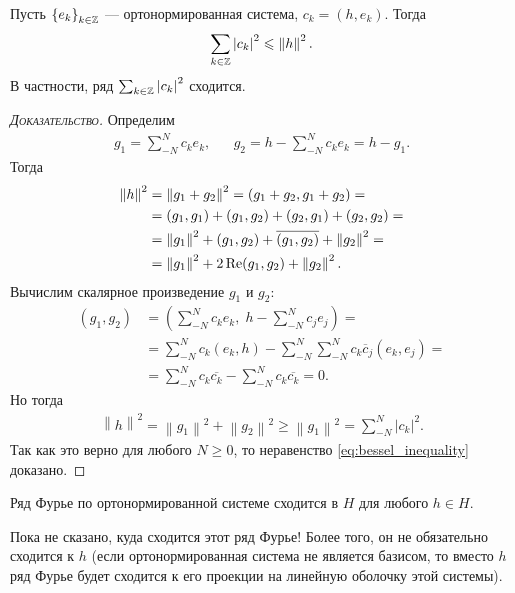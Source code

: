 \documentclass[../complex-analysis.tex]{subfiles}
\begin{document}
\begin{claim}
 Пусть $ \left\{e_k\right\}_{k \in \mathbb{Z}}  $ --- ортонормированная система, $ c_k = (h,e_k) $. Тогда 
 \begin{align}
  \label{eq:bessel_inequality}
  \sum_{k \in\mathbb{Z}} \left| c_k \right|^{2} \leqslant \left\| h \right\|^{2}.
 \end{align} В частности, ряд $ \sum_{k \in \mathbb{Z}} \left| c_k \right|^{2} $ сходится.
\end{claim}
\begin{proof}[\normalfont\textsc{Доказательство}]
 Определим
 \begin{align*}
  g_1 = \sum_{-N}^{N}c_ke_k, && g_2 = h - \sum_{-N}^{N}c_ke_k = h - g_1.
 \end{align*} Тогда
 \begin{align*}
  \left\| h \right\|^{2} &= \left\| g_1 + g_2 \right\|^{2} = (g_1+g_2,g_1+g_2) = \\
  &= (g_1,g_1) + (g_1,g_2) + (g_2,g_1) + (g_2,g_2) = \\
  &= \left\| g_1 \right\|^{2} + (g_1, g_2) + \overline{(g_1,g_2)} + \left\| g_2 \right\|^{2} = \\
  &= \left\| g_1 \right\|^{2} + 2 \operatorname{Re} (g_1,g_2) + \left\| g_2 \right\|^{2}.
 \end{align*}
 Вычислим скалярное произведение $ g_1 $ и $ g_2 $:
 \begin{align*}
  (g_1,g_2) &= \left( \sum_{-N}^{N}c_ke_k,\; h - \sum_{-N}^{N} c_je_j \right) = \\
  &=  \sum_{-N}^{N}c_k(e_k,h)  - \sum_{-N}^{N} \sum_{-N}^{N} c_k \overline c_j (e_k, e_j) = \\
  &= \sum_{-N}^{N} c_k \overline{c_k} - \sum_{-N}^{N}c_k \overline{c_k} = 0.
 \end{align*} Но тогда
 \begin{align*}
  \left\| h \right\|^{2} = \left\| g_1 \right\|^{2} + \left\| g_2 \right\|^{2} \geqslant \left\| g_1 \right\|^{2} = \sum_{-N}^{N}\left| c_k \right|^{2}.
 \end{align*} Так как это верно для любого $ N \geqslant 0 $, то неравенство \eqref{eq:bessel_inequality} доказано.
\end{proof}

\begin{claim}
 Ряд Фурье по ортонормированной системе сходится в $ H $ для любого $ h \in H $.
\end{claim}

Пока не сказано, куда сходится этот ряд Фурье! Более того, он не обязательно сходится к $ h $ (если ортонормированная система не является базисом, то вместо $ h $ ряд Фурье будет сходится к его проекции на линейную оболочку этой системы).
\end{document}
